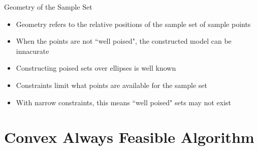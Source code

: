 \documentclass{beamer}
\begin{document}
\begin{frame}{Geometry of the Sample Set}
    \begin{itemize}
        \item<1, 2, 3> Geometry refers to the relative positions of the sample set of sample points
        \item<1, 2, 3> When the points are not ``well poised", the constructed model can be innacurate \\
        \item<3> Constructing poised sets over ellipses is well known
        \item<3> Constraints limit what points are available for the sample set
        \item<3> With narrow constraints, this means ``well poised" sets may not exist
    \end{itemize}
\end{frame}





\section{Convex Always Feasible Algorithm}
\end{document}

